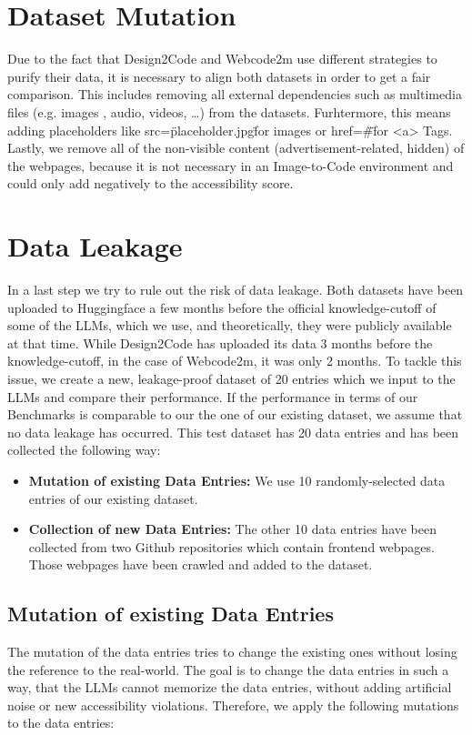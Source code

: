 \section{Dataset Mutation}
Due to the fact that Design2Code and Webcode2m use different strategies to purify
their data, it is necessary to align both datasets in order to get a fair comparison.
This includes removing all external dependencies such as multimedia files (e.g. images
, audio, videos, {\ldots}) from the datasets. Furhtermore, this means adding 
placeholders like src=\"placeholder.jpg\" for images or href=\"\#\" for <a> Tags.
Lastly, we remove all of the non-visible content (advertisement-related, hidden) 
of the webpages, because it is not necessary in an Image-to-Code environment and 
could only add negatively to the accessibility score.


\section{Data Leakage}
In a last step we try to rule out the risk of data leakage. Both datasets have been
uploaded to Huggingface a few months before the official knowledge-cutoff of some of the LLMs, which
we use, and theoretically, they were publicly available at that time. 
While Design2Code has uploaded its data 3 months before the knowledge-cutoff, in the 
case of Webcode2m, it was only 2 months. To tackle this issue, we create a 
new, leakage-proof dataset of 20 entries which we input to the LLMs and compare their 
performance. If the performance in terms of our Benchmarks is comparable to our the one 
of our existing dataset, we assume that no data leakage has occurred.\newline
This test dataset has 20 data entries and has been collected the following way:

\begin{itemize}
  \item \textbf{Mutation of existing Data Entries:} We use 10 randomly-selected data entries of our existing 
  dataset. 
  \item \textbf{Collection of new Data Entries:} The other 10 data entries have been collected from 
  two Github repositories which contain frontend webpages. Those webpages have been crawled 
  and added to the dataset.
\end{itemize}

\subsection{Mutation of existing Data Entries}
The mutation of the data entries tries to change the existing ones without losing the 
reference to the real-world. The goal is to change the data entries in such a way, that
the LLMs cannot memorize the data entries, without adding artificial noise or new 
accessibility violations. Therefore, we apply the following mutations to the data entries:

